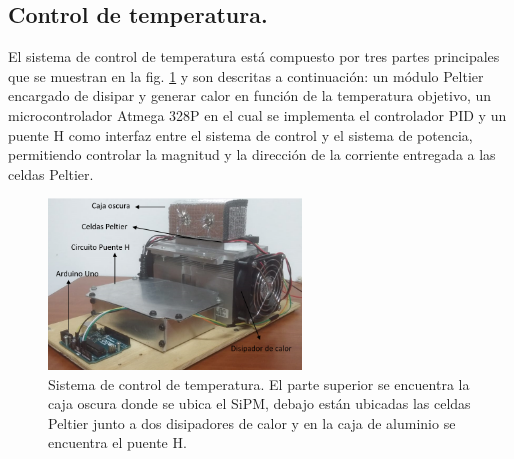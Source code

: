 \subsection{Control de temperatura.}
El sistema de control de temperatura está compuesto por tres partes principales que se muestran en la fig. \ref{fig:Temp_system} y son descritas a continuación: un módulo Peltier encargado de disipar y generar calor en función de la temperatura objetivo, un microcontrolador Atmega 328P en el cual se implementa el controlador PID y  un puente H como interfaz entre el sistema de control y el sistema de potencia, permitiendo controlar la magnitud y la dirección de la corriente entregada a las celdas Peltier.
\begin{figure}[h!]
\begin{centering}
  \includegraphics[width=0.6\textwidth]{Images/Sistema_termico}
    \caption{Sistema de control de temperatura. El parte superior se encuentra la caja oscura donde se ubica el SiPM, debajo están ubicadas las celdas Peltier junto a dos disipadores de calor y en la caja de aluminio se encuentra el puente H.}
    \label{fig:Temp_system}
  \par\end{centering}
\end{figure}

